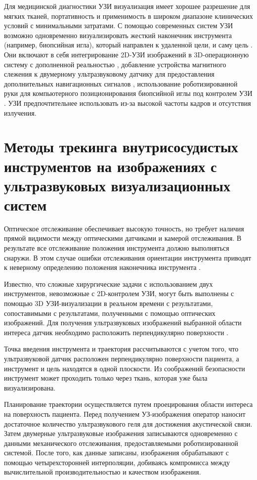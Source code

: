 Для медицинской диагностики УЗИ визуализация имеет хорошее разрешение для мягких тканей, портативность и применимость в широком диапазоне клинических условий с минимальными затратами. С помощью современных систем УЗИ возможно одновременно визуализировать жесткий наконечник инструмента (например, биопсийная игла), который направлен к удаленной цели, и саму цель \cite{litlink31}. Они включают в себя интегрирование 2D-УЗИ изображений в 3D-операционную систему с дополненной реальностью \cite{litlink32}, добавление устройства магнитного слежения к двумерному ультразвуковому датчику для предоставления дополнительных навигационных сигналов \cite{litlink33}, использование роботизированной руки для компьютерного позиционирования
биопсийной иглы под контролем УЗИ \cite{litlink34}. УЗИ предпочтительнее использовать из-за высокой частоты кадров и отсутствия излучения.

\section{Методы трекинга внутрисосудистых инструментов на изображениях с ультразвуковых визуализационных систем}

Оптическое отслеживание обеспечивает высокую точность, но требует
наличия прямой видимости между оптическими датчиками и камерой отслеживания. В результате все отслеживание положения инструмента должно выполняться снаружи. В этом случае ошибки отслеживания ориентации инструмента приводят к неверному определению положения наконечника инструмента \cite{litlink30}.

Известно, что сложные хирургические задачи с использованием двух инструментов, невозможные с 2D-контролем УЗИ, могут быть выполнены с помощью 3D УЗИ-визуализации в реальном времени с результатами, сопоставимыми с результатами, полученными с помощью оптических изображений. Для получения ультразвуковых изображений выбранной области интереса датчик необходимо расположить перпендикулярно поверхности \cite{litlink35}. 

Точка введения инструмента и траектория рассчитываются с учетом того, что ультразвуковой датчик расположен перпендикулярно поверхности пациента, а инструмент и цель находятся в одной плоскости. Из соображений безопасности инструмент может проходить только через ткань, которая уже была визуализирована.

Планирование траектории осуществляется путем проецирования области интереса на поверхность пациента. Перед получением УЗ-изображения оператор наносит достаточное количество ультразвукового геля для достижения акустической связи. Затем двумерные ультразвуковые изображения записываются одновременно с данными механического отслеживания, предоставляемыми роботизированной системой. После того, как данные записаны, изображения обрабатывают с помощью четырехсторонней интерполяции, добиваясь компромисса между вычислительной производительностью и качеством изображения.

